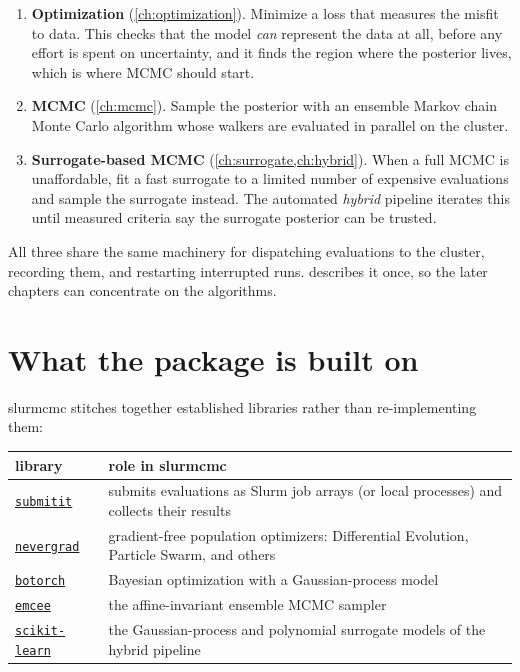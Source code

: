 \begin{enumerate}[leftmargin=*, label=\textbf{\arabic*.}]
  \item \textbf{Optimization} (\cref{ch:optimization}). Minimize a loss that measures the misfit
        to data. This checks that the model \emph{can} represent the data at all, before any
        effort is spent on uncertainty, and it finds the region where the posterior lives, which
        is where MCMC should start.
  \item \textbf{MCMC} (\cref{ch:mcmc}). Sample the posterior with an ensemble Markov chain Monte
        Carlo algorithm whose walkers are evaluated in parallel on the cluster.
  \item \textbf{Surrogate-based MCMC} (\cref{ch:surrogate,ch:hybrid}). When a full MCMC is
        unaffordable, fit a fast surrogate to a limited number of expensive evaluations and sample
        the surrogate instead. The automated \emph{hybrid} pipeline iterates this until measured
        criteria say the surrogate posterior can be trusted.
\end{enumerate}

All three share the same machinery for dispatching evaluations to the cluster, recording them,
and restarting interrupted runs.  describes it once, so the later chapters can
concentrate on the algorithms.

\section{What the package is built on}

slurmcmc stitches together established libraries rather than re-implementing them:

\begin{center}
\small
\begin{tabularx}{\linewidth}{@{}l L@{}}
  \toprule
  \textbf{library} & \textbf{role in slurmcmc} \\
  \midrule
  \href{https://github.com/facebookincubator/submitit}{\texttt{submitit}} &
    submits evaluations as Slurm job arrays (or local processes) and collects their results \\
  \href{https://github.com/facebookresearch/nevergrad}{\texttt{nevergrad}} &
    gradient-free population optimizers: Differential Evolution, Particle Swarm, and others \\
  \href{https://github.com/pytorch/botorch}{\texttt{botorch}} &
    Bayesian optimization with a Gaussian-process model \citep{balandat2020} \\
  \href{https://github.com/dfm/emcee}{\texttt{emcee}} &
    the affine-invariant ensemble MCMC sampler \citep{foreman2013} \\
  \href{https://scikit-learn.org}{\texttt{scikit-learn}} &
    the Gaussian-process and polynomial surrogate models of the hybrid pipeline \\
  \bottomrule
\end{tabularx}
\end{center}

